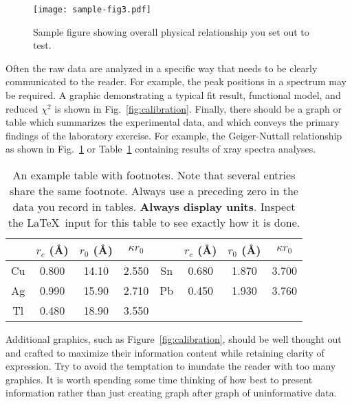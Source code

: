 \begin{figure}[htb]
\texttt{[image: sample-fig3.pdf]}			%
\caption{Sample figure showing overall physical relationship you set
out to test.
\label{fig:frenchtaylor}
}
\end{figure}

Often the raw data are analyzed in a specific way that needs to be clearly
communicated to the reader.  For example, the peak positions in a
spectrum may be required.  A graphic demonstrating a typical
fit result, functional model, and reduced $\chi^2$ is shown in
Fig.~\ref{fig:calibration}. Finally, there should be a graph or table
which summarizes the experimental data, and which conveys the primary
findings of the laboratory exercise.
For example, the Geiger-Nuttall relationship as shown in Fig.~\ref{fig:frenchtaylor}
or Table~\ref{tab:table1} containing results of xray spectra analyses.

\begin{table}[htb]
\caption{\label{tab:table1}An example table with footnotes.  Note
that several entries share the same footnote. Always use a preceding
zero in the data you record in tables.  \textbf{Always display units}.
Inspect the \LaTeX\ input for this table to see exactly how it is
done.}
\begin{ruledtabular}
\begin{tabular}{cccccccc}
 &$r_c$ (\AA)&$r_0$ (\AA)&$\kappa r_0$&
 &$r_c$ (\AA) &$r_0$ (\AA)&$\kappa r_0$\\
\hline
Cu& 0.800 & 14.10 & 2.550 &Sn\footnotemark[1] & 0.680 & 1.870 & 3.700 \\
Ag& 0.990 & 15.90 & 2.710 &Pb\footnotemark[1] & 0.450 & 1.930 & 3.760 \\
Tl& 0.480 & 18.90 & 3.550 & & & & \\
\end{tabular}
\end{ruledtabular}
\end{table}

Additional graphics, such as Figure~\ref{fig:calibration}, should be well
thought out and crafted to maximize their information content while
retaining clarity of expression.
Try to avoid the temptation to inundate the reader with too many
graphics.  It is worth spending some time thinking of how best to
present information rather than just creating graph after graph of
uninformative data.

